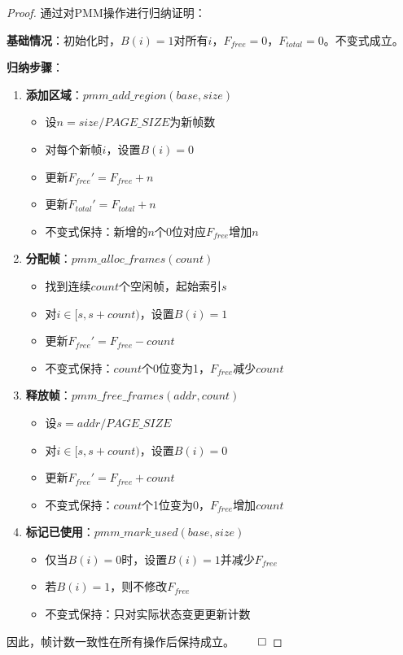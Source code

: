 \documentclass{article}
\theoremstyle{definition}
\theoremstyle{remark}
\begin{document}
\begin{proof}
    通过对PMM操作进行归纳证明：

    \textbf{基础情况}：初始化时，$B(i) = 1$对所有$i$，$F_{free} = 0$，$F_{total} = 0$。不变式成立。

    \textbf{归纳步骤}：
    \begin{enumerate}
        \item \textbf{添加区域}：$pmm\_add\_region(base, size)$
        \begin{itemize}
            \item 设$n = size / PAGE\_SIZE$为新帧数
            \item 对每个新帧$i$，设置$B(i) = 0$
            \item 更新$F_{free}' = F_{free} + n$
            \item 更新$F_{total}' = F_{total} + n$
            \item 不变式保持：新增的$n$个0位对应$F_{free}$增加$n$
        \end{itemize}

        \item \textbf{分配帧}：$pmm\_alloc\_frames(count)$
        \begin{itemize}
            \item 找到连续$count$个空闲帧，起始索引$s$
            \item 对$i \in [s, s+count)$，设置$B(i) = 1$
            \item 更新$F_{free}' = F_{free} - count$
            \item 不变式保持：$count$个0位变为1，$F_{free}$减少$count$
        \end{itemize}

        \item \textbf{释放帧}：$pmm\_free\_frames(addr, count)$
        \begin{itemize}
            \item 设$s = addr / PAGE\_SIZE$
            \item 对$i \in [s, s+count)$，设置$B(i) = 0$
            \item 更新$F_{free}' = F_{free} + count$
            \item 不变式保持：$count$个1位变为0，$F_{free}$增加$count$
        \end{itemize}

        \item \textbf{标记已使用}：$pmm\_mark\_used(base, size)$
        \begin{itemize}
            \item 仅当$B(i) = 0$时，设置$B(i) = 1$并减少$F_{free}$
            \item 若$B(i) = 1$，则不修改$F_{free}$
            \item 不变式保持：只对实际状态变更更新计数
        \end{itemize}
    \end{enumerate}
    因此，帧计数一致性在所有操作后保持成立。$\qed$
\end{proof}
\end{document}

